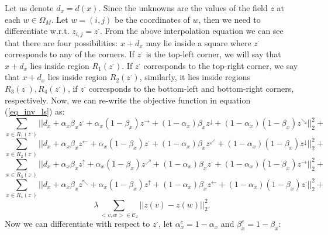 \documentclass[11pt]{article}
\begin{document}
Let us denote $d_{x} = d(x)$. Since the unknowns are the values of the field $z$ at each $w\in\Omega_{M}$. Let $w=(i,j)$ be the coordinates of $w$, then we need to differentiate w.r.t. $z_{i,j}=z^{\cdot}$. From the above interpolation equation we can see that there are four possibilities: $x+d_{x}$ may lie inside a square where $z^{\cdot}$ corresponds to any of the corners. If $z^{\cdot}$ is the top-left corner, we will say that $x+d_{x}$ lies inside region $R_{1}(z^{\cdot})$. If $z^{\cdot}$ corresponds to the top-right corner, we say that $x+d_{x}$ lies inside region $R_{2}(z^{\cdot})$, similarly, it lies inside regions $R_{3}(z^{\cdot}), R_{4}(z^{\cdot})$, if $z^{\cdot}$ corresponds to the bottom-left and bottom-right corners, respectively. Now, we can re-write the objective function in equation (\ref{eq_inv_ls}) as:
\begin{displaymath}
	\sum_{x\in R_{1}(z^{\cdot})}||d_x + \alpha_{x}\beta_{x}z^{\cdot} + \alpha_{x}(1-\beta_{x})z^{\rightarrow} + (1-\alpha_{x})\beta_{x}z^{\downarrow} + (1-\alpha_{x})(1-\beta_{x})z^{\searrow}||_{2}^{2} +
\end{displaymath}
\begin{displaymath}
	\sum_{x\in R_{2}(z^{\cdot})}||d_x + \alpha_{x}\beta_{x}z^{\leftarrow} + \alpha_{x}(1-\beta_{x})z^{\cdot} + (1-\alpha_{x})\beta_{x}z^{\swarrow} + (1-\alpha_{x})(1-\beta_{x})z^{\downarrow}||_{2}^{2} +
\end{displaymath}
\begin{displaymath}
	\sum_{x\in R_{3}(z^{\cdot})}||d_x + \alpha_{x}\beta_{x}z^{\uparrow} + \alpha_{x}(1-\beta_{x})z^{\nearrow} + (1-\alpha_{x})\beta_{x}z^{\cdot} + (1-\alpha_{x})(1-\beta_{x})z^{\rightarrow}||_{2}^{2} +
\end{displaymath}
\begin{displaymath}
	\sum_{x\in R_{4}(z^{\cdot})}||d_x + \alpha_{x}\beta_{x}z^{\nwarrow} + \alpha_{x}(1-\beta_{x})z^{\uparrow} + (1-\alpha_{x})\beta_{x}z^{\leftarrow} + (1-\alpha_{x})(1-\beta_{x})z^{\cdot}||_{2}^{2} +
\end{displaymath}
\begin{displaymath}
	\lambda \sum_{<v,w>\in \mathcal{C}_{2}} ||z(v) -z(w)||_{2}^{2}.
\end{displaymath}
Now we can differentiate with respect to $z^{\cdot}$, let $\alpha_{x}^{c}=1-\alpha_{x}$ and $\beta_{x}^{c} = 1-\beta_{x}$:
\end{document}
